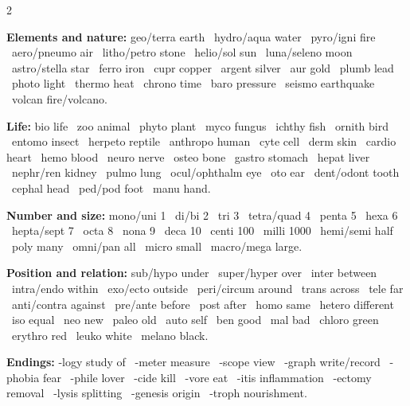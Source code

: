 \documentclass[10pt]{article}
\makeatletter
\newcommand{\sub}[1]{\par\vspace{2.5pt}{\sffamily\bfseries\color{dblue}#1}\par\nobreak\vspace{0.5pt}\@afterheading}
\makeatother
\begin{document}
\begin{multicols}{2}
\sub{B. Word roots worth knowing}
{\footnotesize
\textbf{Elements and nature:} geo/terra earth \textbullet\ hydro/aqua water \textbullet\ pyro/igni fire \textbullet\ aero/pneumo air \textbullet\ litho/petro stone \textbullet\ helio/sol sun \textbullet\ luna/seleno moon \textbullet\ astro/stella star \textbullet\ ferro iron \textbullet\ cupr copper \textbullet\ argent silver \textbullet\ aur gold \textbullet\ plumb lead \textbullet\ photo light \textbullet\ thermo heat \textbullet\ chrono time \textbullet\ baro pressure \textbullet\ seismo earthquake \textbullet\ volcan fire/volcano.\par
\textbf{Life:} bio life \textbullet\ zoo animal \textbullet\ phyto plant \textbullet\ myco fungus \textbullet\ ichthy fish \textbullet\ ornith bird \textbullet\ entomo insect \textbullet\ herpeto reptile \textbullet\ anthropo human \textbullet\ cyte cell \textbullet\ derm skin \textbullet\ cardio heart \textbullet\ hemo blood \textbullet\ neuro nerve \textbullet\ osteo bone \textbullet\ gastro stomach \textbullet\ hepat liver \textbullet\ nephr/ren kidney \textbullet\ pulmo lung \textbullet\ ocul/ophthalm eye \textbullet\ oto ear \textbullet\ dent/odont tooth \textbullet\ cephal head \textbullet\ ped/pod foot \textbullet\ manu hand.\par
\textbf{Number and size:} mono/uni 1 \textbullet\ di/bi 2 \textbullet\ tri 3 \textbullet\ tetra/quad 4 \textbullet\ penta 5 \textbullet\ hexa 6 \textbullet\ hepta/sept 7 \textbullet\ octa 8 \textbullet\ nona 9 \textbullet\ deca 10 \textbullet\ centi 100 \textbullet\ milli 1000 \textbullet\ hemi/semi half \textbullet\ poly many \textbullet\ omni/pan all \textbullet\ micro small \textbullet\ macro/mega large.\par
\textbf{Position and relation:} sub/hypo under \textbullet\ super/hyper over \textbullet\ inter between \textbullet\ intra/endo within \textbullet\ exo/ecto outside \textbullet\ peri/circum around \textbullet\ trans across \textbullet\ tele far \textbullet\ anti/contra against \textbullet\ pre/ante before \textbullet\ post after \textbullet\ homo same \textbullet\ hetero different \textbullet\ iso equal \textbullet\ neo new \textbullet\ paleo old \textbullet\ auto self \textbullet\ ben good \textbullet\ mal bad \textbullet\ chloro green \textbullet\ erythro red \textbullet\ leuko white \textbullet\ melano black.\par
\textbf{Endings:} -logy study of \textbullet\ -meter measure \textbullet\ -scope view \textbullet\ -graph write/record \textbullet\ -phobia fear \textbullet\ -phile lover \textbullet\ -cide kill \textbullet\ -vore eat \textbullet\ -itis inflammation \textbullet\ -ectomy removal \textbullet\ -lysis splitting \textbullet\ -genesis origin \textbullet\ -troph nourishment.\par}


\end{multicols}
\end{document}
